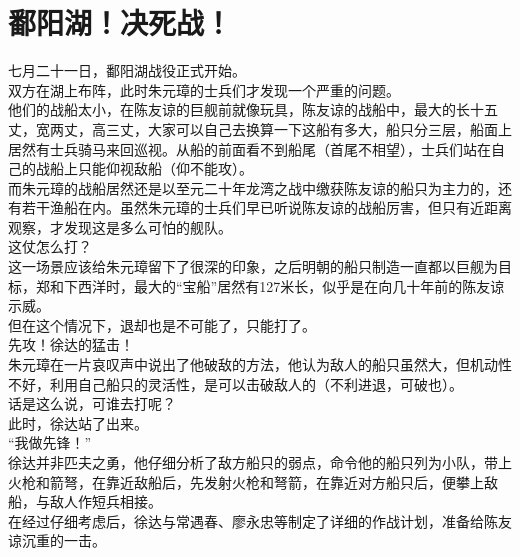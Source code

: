 \section{鄱阳湖！决死战！}
\ifnum{}
	\begin{multicols}{\theparacolNo}
\fi
七月二十一日，鄱阳湖战役正式开始。\\

双方在湖上布阵，此时朱元璋的士兵们才发现一个严重的问题。\\

他们的战船太小，在陈友谅的巨舰前就像玩具，陈友谅的战船中，最大的长十五丈，宽两丈，高三丈，大家可以自己去换算一下这船有多大，船只分三层，船面上居然有士兵骑马来回巡视。从船的前面看不到船尾（首尾不相望），士兵们站在自己的战船上只能仰视敌船（仰不能攻）。\\

而朱元璋的战船居然还是以至元二十年龙湾之战中缴获陈友谅的船只为主力的，还有若干渔船在内。虽然朱元璋的士兵们早已听说陈友谅的战船厉害，但只有近距离观察，才发现这是多么可怕的舰队。\\

这仗怎么打？\\

这一场景应该给朱元璋留下了很深的印象，之后明朝的船只制造一直都以巨舰为目标，郑和下西洋时，最大的“宝船”居然有127米长，似乎是在向几十年前的陈友谅示威。\\

但在这个情况下，退却也是不可能了，只能打了。\\

先攻！徐达的猛击！\\

朱元璋在一片哀叹声中说出了他破敌的方法，他认为敌人的船只虽然大，但机动性不好，利用自己船只的灵活性，是可以击破敌人的（不利进退，可破也）。\\

话是这么说，可谁去打呢？\\

此时，徐达站了出来。\\

“我做先锋！”\\

徐达并非匹夫之勇，他仔细分析了敌方船只的弱点，命令他的船只列为小队，带上火枪和箭弩，在靠近敌船后，先发射火枪和弩箭，在靠近对方船只后，便攀上敌船，与敌人作短兵相接。\\

在经过仔细考虑后，徐达与常遇春、廖永忠等制定了详细的作战计划，准备给陈友谅沉重的一击。\\


\end{multicols}
